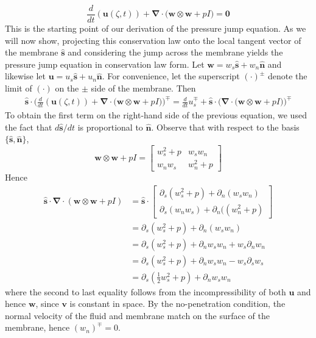 \documentclass{article}[12pt]
\theoremstyle{Theorem}
\begin{document}
\begin{equation}
    \frac{d}{dt}(\boldsymbol{u}(\zeta,t))  + \boldsymbol{\nabla}\cdot\big(\boldsymbol{w}\otimes\boldsymbol{w} + pI\big) = \boldsymbol{0}
    \label{conservation law form of euler }
\end{equation}
This is the starting point of our derivation of the pressure jump equation. As we will now show, projecting this conservation law onto the local tangent vector of the membrane $\hat{\boldsymbol{s}}$ and considering the jump across the membrane yields the pressure jump equation in conservation law form. 
Let $\boldsymbol{w} = w_s\hat{\boldsymbol{s}} + w_n\hat{\boldsymbol{n}}$ and likewise let $\boldsymbol{u} = u_s\hat{\boldsymbol{s}} + u_n\hat{\boldsymbol{n}}$. For convenience, let the superscript $(\cdot)^\pm$ denote the limit of $(\cdot)$ on the $\pm$ side of the membrane.
Then 
\begin{align}  \hat{\boldsymbol{s}}\cdot\bigg(\frac{d}{dt}(\boldsymbol{u}(\zeta,t))  + \boldsymbol{\nabla}\cdot\big(\boldsymbol{w}\otimes\boldsymbol{w} + pI\big)\bigg)^\mp = \frac{d}{dt}u_s^\mp + \hat{\boldsymbol{s}}\cdot\bigg(\boldsymbol{\nabla}\cdot\big(\boldsymbol{w}\otimes\boldsymbol{w} + pI\big)\bigg)^\mp
\end{align}
To obtain the first term on the right-hand side of the previous equation, we used the fact that $d\hat{\boldsymbol{s}}/dt$ is proportional to $\hat{\boldsymbol{n}}$.
Observe that with respect to the basis $\{\hat{\boldsymbol{s}},\hat{\boldsymbol{n}}\}$,
\begin{equation}
    \boldsymbol{w}\otimes\boldsymbol{w} + pI = \begin{bmatrix}
        w_s^2 +p & w_sw_n \\
        w_nw_s & w_n^2 + p
    \end{bmatrix}
\end{equation}
Hence 
\begin{align}
    \hat{\boldsymbol{s}}\cdot\boldsymbol{\nabla}\cdot(\boldsymbol{w}\otimes\boldsymbol{w} + pI) &= 
    \hat{\boldsymbol{s}}\cdot\begin{bmatrix}
        \partial_s(w_s^2 +p) + \partial_n(w_sw_n) \\
        \partial_s(w_nw_s) + \partial_n((w_n^2 + p)
    \end{bmatrix} \\ 
    &=\partial_s(w_s^2 +p) + \partial_n(w_sw_n)\\
    &=\partial_s(w_s^2 +p) + \partial_nw_sw_n + w_s\partial_nw_n \\ 
    &=\partial_s(w_s^2 +p) + \partial_nw_sw_n - w_s\partial_sw_s \\
    &= \partial_s(\frac{1}{2}w_s^2 +p) + \partial_nw_sw_n
\end{align}
where the second to last equality follows from the incompressibility of both $\boldsymbol{u}$ and hence $\boldsymbol{w}$, since $\boldsymbol{v}$ is constant in space. By the no-penetration condition, the normal velocity of the fluid and membrane match on the surface of the membrane, hence $(w_n)^\mp =0$.
\end{document}
